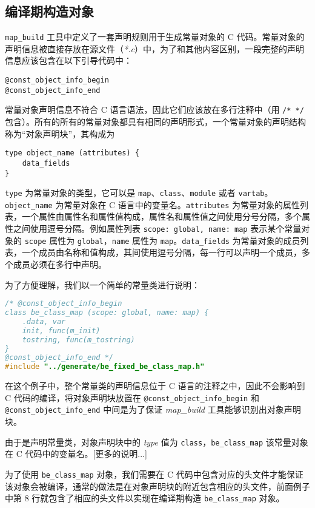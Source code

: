 \subsection{编译期构造对象}

\texttt{map\_build} 工具中定义了一套声明规则用于生成常量对象的 C 代码。常量对象的声明信息被直接存放在源文件（\textsl{*.c}）中，为了和其他内容区别，一段完整的声明信息应该包含在以下引导代码中：
\begin{lstlisting}[numbers=none]
@const_object_info_begin
@const_object_info_end
\end{lstlisting}
常量对象声明信息不符合 C 语言语法，因此它们应该放在多行注释中（用 \texttt{/* */} 包含）。所有的所有的常量对象都具有相同的声明形式，一个常量对象的声明结构称为``对象声明块''，其构成为
\begin{lstlisting}[numbers=none]
type object_name (attributes) {
    data_fields
}
\end{lstlisting}
\texttt{type} 为常量对象的类型，它可以是 \texttt{map}、\texttt{class}、\texttt{module} 或者 \texttt{vartab}。\texttt{object\_name} 为常量对象在 C 语言中的变量名。\texttt{attributes} 为常量对象的属性列表，一个属性由属性名和属性值构成，属性名和属性值之间使用分号分隔，多个属性之间使用逗号分隔。例如属性列表 \texttt{scope: global, name: map} 表示某个常量对象的 \texttt{scope} 属性为 \texttt{global}，\texttt{name} 属性为 \texttt{map}。\texttt{data\_fields} 为常量对象的成员列表，一个成员由名称和值构成，其间使用逗号分隔，每一行可以声明一个成员，多个成员必须在多行中声明。

为了方便理解，我们以一个简单的常量类进行说明：
\begin{lstlisting}[language=c]
/* @const_object_info_begin
class be_class_map (scope: global, name: map) {
    .data, var
    init, func(m_init)
    tostring, func(m_tostring)
}
@const_object_info_end */
#include "../generate/be_fixed_be_class_map.h"
\end{lstlisting}
在这个例子中，整个常量类的声明信息位于 C 语言的注释之中，因此不会影响到 C 代码的编译，将对象声明块放置在 \texttt{@const\_object\_info\_begin} 和 \texttt{@const\_object\_info\_end} 中间是为了保证 \textsl{map\_build} 工具能够识别出对象声明块。

由于是声明常量类，对象声明块中的 \textsl{type} 值为 \texttt{class}，\texttt{be\_class\_map} 该常量对象在 C 代码中的变量名。[更多的说明...]

为了使用 \texttt{be\_class\_map} 对象，我们需要在 C 代码中包含对应的头文件才能保证该对象会被编译，通常的做法是在对象声明块的附近包含相应的头文件，前面例子中第 8 行就包含了相应的头文件以实现在编译期构造 \texttt{be\_class\_map} 对象。


